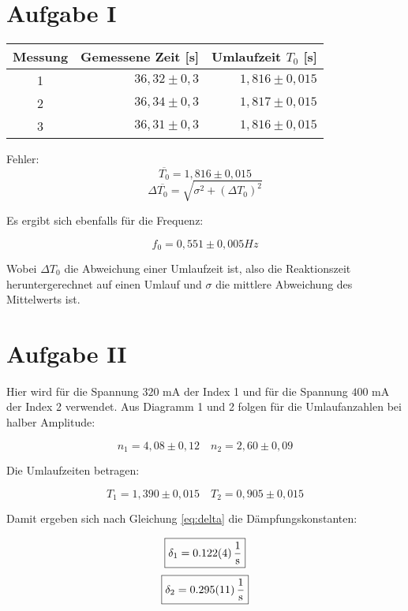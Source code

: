\section{Aufgabe I}

\begin{table}[h!]
    \centering
    \begin{tabular}{c r r}
        \toprule
        Messung & Gemessene Zeit [s] & Umlaufzeit $T_0$ [s] \\
        \midrule
        1 & $36,32 \pm 0,3$ & $ 1,816 \pm 0,015$ \\
        2 & $36,34 \pm 0,3$ & $ 1,817 \pm 0,015$ \\
        3 & $36,31 \pm 0,3$ & $ 1,816 \pm 0,015$ \\
        \bottomrule
    \end{tabular}
\end{table}
Fehler:
\[\boxed{\overline{T_0} = 1,816 \pm 0,015}\]
\begin{equation}
    \Delta \overline{T_0} = \sqrt{\sigma^2 + (\Delta T_0)^2}
\end{equation}

Es ergibt sich ebenfalls für die Frequenz:

\[\boxed{f_0 = 0,551 \pm 0,005 \si{Hz}}\]

Wobei $\Delta T_0$ die Abweichung einer Umlaufzeit ist, also die Reaktionszeit heruntergerechnet auf einen Umlauf und $\sigma$ die
mittlere Abweichung des Mittelwerts ist.


\section{Aufgabe II}
Hier wird für die Spannung $320$ mA der Index 1 und für die Spannung $400$ mA der Index 2 verwendet. 
Aus Diagramm 1 und 2 folgen für die Umlaufanzahlen bei halber Amplitude:

\[n_1 = 4,08 \pm 0,12\quad n_2 = 2,60 \pm 0,09\]

Die Umlaufzeiten betragen:

\[T_1 = 1,390 \pm 0,015\quad T_2 = 0,905 \pm 0,015\]

Damit ergeben sich nach Gleichung \ref{eq:delta} die Dämpfungskonstanten:

    \[\boxed{\delta_1 = \SI{0,122 \pm 0,004}{\frac{1}{\second}}}\notag\]
    \[\boxed{\delta_2 = \SI{0,295 \pm 0,011}{\frac{1}{\second}}}\notag\]

